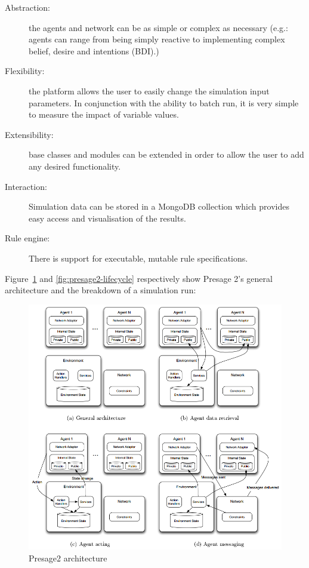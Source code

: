 \begin{description}
	\item[Abstraction:] the agents and network can be as simple or complex as necessary (e.g.: agents can range from being simply reactive to implementing complex belief, desire and intentions (BDI).)

	\item[Flexibility:] the platform allows the user to easily change the simulation input parameters. In conjunction with the ability to batch run, it is very simple to measure the impact of variable values.

	\item[Extensibility:] base classes and modules can be extended in order to allow the user to add any desired functionality.

	\item[Interaction:] Simulation data can be stored in a MongoDB collection which provides easy access and visualisation of the results.

	\item[Rule engine:] There is support for executable, mutable rule specifications.
\end{description}

Figure~\ref{fig:presage2-architecture} and \ref{fig:presage2-lifecycle} respectively show Presage 2's general architecture and the breakdown of a simulation run:

\begin{figure}[h!]
	\centering
	\includegraphics[width=\textwidth]{img/presage2-arch.png}
	\caption{Presage2 architecture~\cite{Sam-Transfer-Report}}
	\label{fig:presage2-architecture}
\end{figure}

